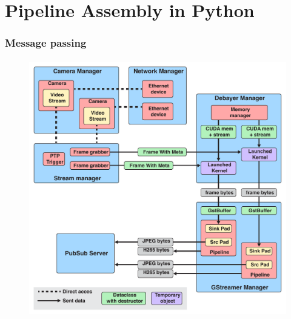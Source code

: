 
\chapter{Pipeline Assembly in Python}
\label{chap:pipeline}
\subsection{Message passing}
\subsubsection{}


\begin{figure}[H]
    \centering
    \includegraphics[width=\textwidth]{figures/object_overview.pdf}
    \caption{\todo}
    \label{fig:pipeline_current}
\end{figure}